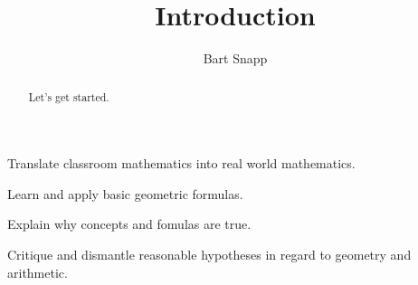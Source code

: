 \documentclass[handout,nooutcomes,noauthor]{ximera}
\title{Introduction}
\author{Bart Snapp}
\begin{document}
\begin{abstract}
  Let's get started.
\end{abstract}
\maketitle


\begin{listSectionOutcomes}
\item Translate classroom mathematics into real world mathematics. %
\item Learn and apply basic geometric formulas.
\item Explain why concepts and fomulas are true.
\item Critique and dismantle reasonable hypotheses in regard to
  geometry and arithmetic.
\end{listSectionOutcomes}




\end{document}
